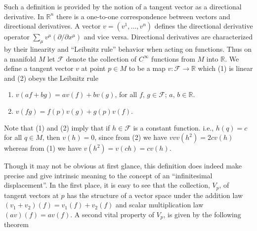 Such a definition is provided by the notion of a tangent vector as a directional derivative. In $\mathbb{R}^n$ there is a one-to-one correspondence between vectors and directional derivatives. A vector $v=(v^1,\ldots,v^n)$ defines the directional derivative operator $\sum_\mu v^\mu(\partial/\partial x^\mu)$ and vice versa. Directional derivatives are characterized by their linearity and ``Leibnitz rule'' behavior when acting on functions. Thus on a manifold $M$ let $\mathscr{F}$ denote the collection of $C^\infty$ functions from $M$ into $\mathbb{R}$. We define a tangent vector $v$ at point $p\in M$ to be a map $v:\mathscr{F}\to\mathbb{R}$ which (1) is linear and (2) obeys the Leibnitz rule
\begin{enumerate}[label=(\arabic*)]
    \item $v(af+bg)=av(f)+bv(g)$, for all $f$, $g\in\mathscr{F}$; $a$, $b\in\mathbb{R}$.
    \item $v(fg)=f(p)v(g)+g(p)v(f)$.
\end{enumerate}

Note that (1) and (2) imply that if $h\in\mathscr{F}$ is a constant function. i.e., $h(q)=c$ for all $q\in M$, then $v(h)=0$, since from (2) we have $vv{v}(h^2)=2cv(h)$ whereas from (1) we have $v(h^2)=v(ch)=cv(h)$.

Though it may not be obvious at first glance, this definition does indeed make precise and give intrinsic meaning to the concept of an ``infinitesimal displacement''. In the first place, it is easy to see that the collection, $V_p$, of tangent vectors at $p$ has the structure of a vector space under the addition law $(v_1+v_2)(f)=v_1(f)+v_2(f)$ and scalar multiplication law $(av)(f)=av(f)$. A second vital property of $V_p$, is given by the following theorem

